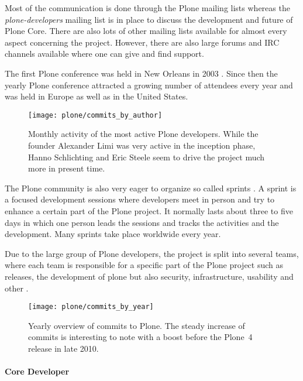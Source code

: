 Most of the communication is done through the Plone mailing lists whereas the
\emph{plone-developers} mailing list is in place to discuss the development and
future of Plone Core. There are also lots of other mailing lists available for
almost every aspect concerning the project. However, there are also large
forums and \ac{IRC} channels available where one can give and find support.

The first Plone conference was held in New Orleans in 2003
\cite{PloneConferences}. Since then the yearly Plone conference attracted a
growing number of attendees every year and was held in Europe as well as in the
United States.

\begin{figure}[htbp]
  \centering
  \texttt{[image: plone/commits\_by\_author]}
  \caption[Commits by most active authors, Plone]
  {Monthly activity of the most active Plone developers. While the founder
    Alexander Limi was very active in the inception phase, Hanno Schlichting
    and Eric Steele seem to drive the project much more in present time.}
\end{figure}

The Plone community is also very eager to organize so called sprints
\cite{PloneSprints}. A sprint is a focused development sessions where
developers meet in person and try to enhance a certain part of the Plone
project. It normally lasts about three to five days in which one person leads
the sessions and tracks the activities and the development. Many sprints take
place worldwide every year.

Due to the large group of Plone developers, the project is split into several
teams, where each team is responsible for a specific part of the Plone project
such as releases, the development of plone but also security, infrastructure,
usability and other
\cite{PloneFounders,PloneReleaseManagers,PloneFrameworkTeam,PloneContribute}.

\begin{figure}[htbp]
  \centering
  \texttt{[image: plone/commits\_by\_year]}
  \caption[Commits by year, Plone]
  {Yearly overview of commits to Plone. The steady increase of commits is
    interesting to note with a boost before the Plone~4 release in late 2010.}
\end{figure}

\paragraph{Core Developer}

